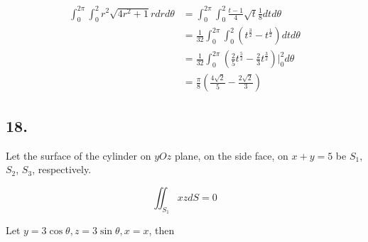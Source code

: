 \documentclass{article}
\begin{document}
  $$\begin{aligned}
    \int_0^{2\pi} \int_0^2 r^2 \sqrt{4r^2 + 1} r dr d\theta &= \int_0^{2\pi} \int_0^2 \frac{t-1}{4} \sqrt{t} \frac 1 8 dt d\theta \\
    &= \frac{1}{32} \int_0^{2\pi} \int_0^2 (t^{\frac 3 2} - t^{\frac 1 2}) dt d\theta \\
    &= \frac{1}{32} \int_0^{2\pi} (\frac 2 5 t^{\frac 5 2} - \frac 2 3 t^{\frac 3 2})\biggl|_0^2 d\theta \\
    &= \frac{\pi}{8} (\frac{4\sqrt 2}{5} - \frac{2\sqrt 2}{3})
  \end{aligned}$$


  \subsection*{18. }







  Let the surface of the cylinder on $yOz$ plane, on the side face, on $x + y = 5$ be $S_1$, $S_2$, $S_3$, respectively.

  $$\iint_{S_1} xz dS = 0$$

  Let $y = 3 \cos \theta, z = 3 \sin \theta, x = x$, then
\end{document}
